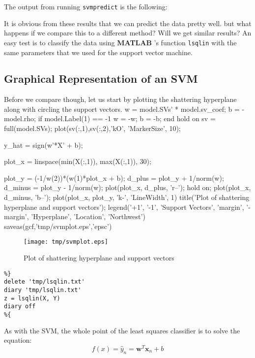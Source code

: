 \documentclass[11pt, twoside]{article}   	%
\newenvironment{matlab}{\comment}{\endcomment}
\begin{document}
The output from running \texttt{svmpredict} is the following: 
\color{lightgray}
\color{black}

It is obvious from these results that we can predict the data pretty well. 
but what happens if we compare this to a different method? Will we get
similar results? An easy test is to classify the data using \textbf{MATLAB}
's function \texttt{lsqlin} with the same parameters that we used 
for the support vector machine. 

\subsection{Graphical Representation of an SVM}

Before we compare though, let us start by plotting the shattering
hyperplane along with circling the support vectors. 
\begin{matlab}
w = model.SVs' * model.sv_coef;
b = -model.rho;
if model.Label(1) == -1
  w = -w;
  b = -b;
end
hold on 
sv = full(model.SVs);
plot(sv(:,1),sv(:,2),'kO', 'MarkerSize', 10);

y_hat = sign(w'*X' + b);

plot_x = linspace(min(X(:,1)), max(X(:,1)), 30);

plot_y = (-1/w(2))*(w(1)*plot_x + b);
d_plus = plot_y + 1/norm(w); 
d_minus = plot_y - 1/norm(w);
plot(plot_x, d_plus, 'r--'); 
hold on; 
plot(plot_x, d_minus, 'b--'); 
plot(plot_x, plot_y, 'k-', 'LineWidth', 1)
title('Plot of shattering hyperplane and support vectors'); 
legend('+1', '-1', 'Support Vectors', 'margin', '-margin', 'Hyperplane', 'Location', 'Northwest')
saveas(gcf,'tmp/svmplot.eps','epsc')

\end{matlab}

\begin{figure}[h]
\centering
\texttt{[image: tmp/svmplot.eps]}
\caption{Plot of shattering hyperplane and support vectors}
\label{fig:svm} 
\end{figure}

\begin{lstlisting}
%}
delete 'tmp/lsqlin.txt'
diary 'tmp/lsqlin.txt'
z = lsqlin(X, Y)  
diary off
%{
\end{lstlisting}

\color{lightgray}
\color{black}

As with the SVM, the whole point of the least squares classifier
is to solve the equation: 
\begin{equation}
f(x) = \hat{y}_n = \bm{w}^T\bm{x}_n + b
\end{equation}
\end{document}
